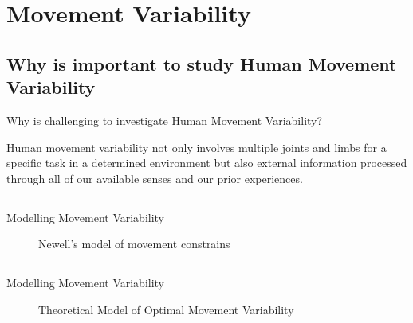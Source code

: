 \section{Movement Variability}


\subsection{Why is important to study Human Movement Variability}
{

\begin{frame}{Why is challenging to investigate Human Movement Variability?}

\Large
Human movement variability not only involves multiple joints and 
limbs for a specific task in a determined environment but also 
external information processed through all of our
available senses and our prior experiences.

\end{frame}
}


\subsection{}
{
\begin{frame}{Modelling Movement Variability}
    \begin{figure}
	\caption{Newell's model of movement constrains} 
   \end{figure}
\end{frame}
}




\subsection{}
{
\begin{frame}{Modelling Movement Variability}
    \begin{figure}
	\caption{Theoretical Model of Optimal Movement Variability} 
   \end{figure}
\end{frame}
}





